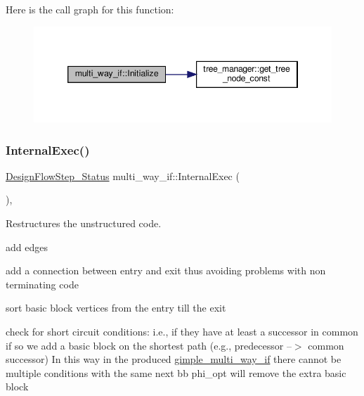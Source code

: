 Here is the call graph for this function\+:
\nopagebreak
\begin{figure}[H]
\begin{center}
\leavevmode
\includegraphics[width=346pt]{dd/dca/classmulti__way__if_a8503a9e02e909dfe59978ad170f2d844_cgraph}
\end{center}
\end{figure}
\mbox{\label{classmulti__way__if_a48bf37aef9a799c0d3b1322e27502a0f}} 
\subsubsection{\texorpdfstring{Internal\+Exec()}{InternalExec()}}
{\footnotesize\ttfamily \hyperlink{design__flow__step_8hpp_afb1f0d73069c26076b8d31dbc8ebecdf}{Design\+Flow\+Step\+\_\+\+Status} multi\+\_\+way\+\_\+if\+::\+Internal\+Exec (\begin{DoxyParamCaption}{ }\end{DoxyParamCaption})\hspace{0.3cm}{\ttfamily [override]}, {\ttfamily [virtual]}}



Restructures the unstructured code. 

add edges

add a connection between entry and exit thus avoiding problems with non terminating code

sort basic block vertices from the entry till the exit

check for short circuit conditions\+: i.\+e., if they have at least a successor in common if so we add a basic block on the shortest path (e.\+g., predecessor --$>$ common successor) In this way in the produced \hyperlink{structgimple__multi__way__if}{gimple\+\_\+multi\+\_\+way\+\_\+if} there cannot be multiple conditions with the same next bb phi\+\_\+opt will remove the extra basic block


